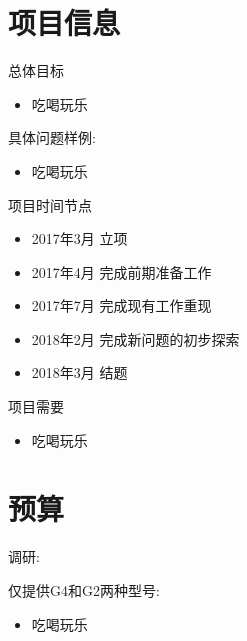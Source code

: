 \documentclass[ignorenonframetext,]{beamer}
\providecommand{\tightlist}{%
  \setlength{\itemsep}{0pt}\setlength{\parskip}{0pt}}
\begin{document}
\section{项目信息}\label{ux9879ux76eeux4fe1ux606f}

\begin{frame}{总体目标}

\begin{itemize}
\tightlist
\item
  吃喝玩乐
\end{itemize}

\end{frame}

\begin{frame}{具体问题样例:}

\begin{itemize}
\tightlist
\item
  吃喝玩乐
\end{itemize}

\end{frame}

\begin{frame}{项目时间节点}

\begin{itemize}
\tightlist
\item
  2017年3月 立项
\item
  2017年4月 完成前期准备工作
\item
  2017年7月 完成现有工作重现
\item
  2018年2月 完成新问题的初步探索
\item
  2018年3月 结题
\end{itemize}

\end{frame}

\begin{frame}{项目需要}

\begin{itemize}
\tightlist
\item
  吃喝玩乐
\end{itemize}

\end{frame}

\section{预算}\label{ux9884ux7b97}

\begin{frame}{调研:}

仅提供G4和G2两种型号:

\begin{itemize}
\tightlist
\item
  吃喝玩乐
\end{itemize}

\end{frame}
\end{document}
